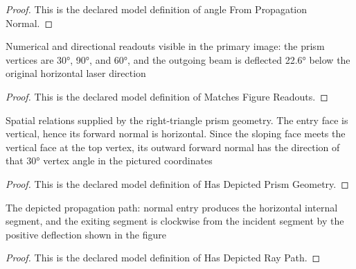 \begin{proof}
  This is the declared model definition of angle From Propagation Normal.
\end{proof}
\begin{definition}
  \label{def:physics:phyx-mini-0050:phyxminiproblems-problemphyxmini0050-matchesfigurereadouts}
  Numerical and directional readouts visible in the primary image: the prism vertices are 30°, 90°, and 60°, and the outgoing beam is deflected 22.6° below the original horizontal laser direction
\end{definition}
\begin{proof}
  This is the declared model definition of Matches Figure Readouts.
\end{proof}
\begin{definition}
  \label{def:physics:phyx-mini-0050:phyxminiproblems-problemphyxmini0050-hasdepictedprismgeometry}
  Spatial relations supplied by the right-triangle prism geometry. The entry face is vertical, hence its forward normal is horizontal. Since the sloping face meets the vertical face at the top vertex, its outward forward normal has the direction of that 30° vertex angle in the pictured coordinates
\end{definition}
\begin{proof}
  This is the declared model definition of Has Depicted Prism Geometry.
\end{proof}
\begin{definition}
  \label{def:physics:phyx-mini-0050:phyxminiproblems-problemphyxmini0050-hasdepictedraypath}
  The depicted propagation path: normal entry produces the horizontal internal segment, and the exiting segment is clockwise from the incident segment by the positive deflection shown in the figure
\end{definition}
\begin{proof}
  This is the declared model definition of Has Depicted Ray Path.
\end{proof}
